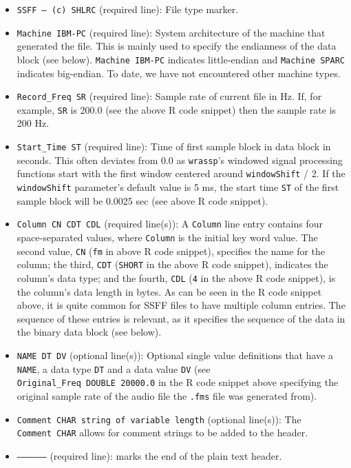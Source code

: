 \documentclass[]{book}
\theoremstyle{definition}
\theoremstyle{definition}
\theoremstyle{definition}
\theoremstyle{remark}
\begin{document}
\begin{itemize}
\item
  \texttt{SSFF\ –\ (c)\ SHLRC} (required line): File type marker.
\item
  \texttt{Machine\ IBM-PC} (required line): System architecture of the
  machine that generated the file. This is mainly used to specify the
  endianness of the data block (see below). \texttt{Machine\ IBM-PC}
  indicates little-endian and \texttt{Machine\ SPARC} indicates
  big-endian. To date, we have not encountered other machine types.
\item
  \texttt{Record\_Freq\ SR} (required line): Sample rate of current file
  in Hz. If, for example, \texttt{SR} is 200.0 (see the above R code
  snippet) then the sample rate is 200 Hz.
\item
  \texttt{Start\_Time\ ST} (required line): Time of first sample block
  in data block in seconds. This often deviates from 0.0 as
  \texttt{wrassp}'s windowed signal processing functions start with the
  first window centered around \texttt{windowShift} / 2. If the
  \texttt{windowShift} parameter's default value is 5 ms, the start time
  \texttt{ST} of the first sample block will be 0.0025 sec (see above R
  code snippet).
\item
  \texttt{Column\ CN\ CDT\ CDL} (required line(s)): A \texttt{Column}
  line entry contains four space-separated values, where \texttt{Column}
  is the initial key word value. The second value, \texttt{CN}
  (\texttt{fm} in above R code snippet), specifies the name for the
  column; the third, \texttt{CDT} (\texttt{SHORT} in the above R code
  snippet), indicates the column's data type; and the fourth,
  \texttt{CDL} (\texttt{4} in the above R code snippet), is the column's
  data length in bytes. As can be seen in the R code snippet above, it
  is quite common for SSFF files to have multiple column entries. The
  sequence of these entries is relevant, as it specifies the sequence of
  the data in the binary data block (see below).
\item
  \texttt{NAME\ DT\ DV} (optional line(s)): Optional single value
  definitions that have a \texttt{NAME}, a data type \texttt{DT} and a
  data value \texttt{DV} (see \texttt{Original\_Freq\ DOUBLE\ 20000.0}
  in the R code snippet above specifying the original sample rate of the
  audio file the \texttt{.fms} file was generated from).
\item
  \texttt{Comment\ CHAR\ string\ of\ variable\ length} (optional
  line(s)): The \texttt{Comment\ CHAR} allows for comment strings to be
  added to the header.
\item
  \texttt{—————–} (required line): marks the end of the plain text
  header.
\end{itemize}
\end{document}
